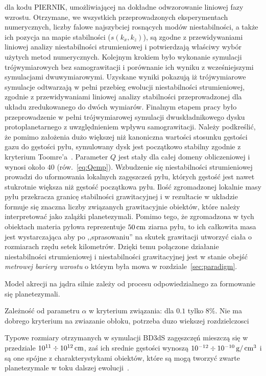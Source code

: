 dla kodu \textsc{PIERNIK}, umożliwiającej na dokładne odwzorowanie liniowej fazy
wzrostu.  Otrzymane, we wszystkich przeprowadzonych eksperymentach numerycznych,
liczby falowe najszybciej rosnących modów niestabilności, a także ich pozycja na
mapie stabilności ($s(k_x, k_z)$), są zgodne z przewidywaniami liniowej analizy
niestabilności strumieniowej i potwierdzają właściwy wybór użytych metod
numerycznych. Kolejnym krokiem było wykonanie symulacji trójwymiarowych bez
samograwitacji i porównanie ich wyniku z wcześniejszymi symulacjami
dwuwymiarowymi. Uzyskane wyniki pokazują iż trójwymiarowe symulacje odtwarzają w
pełni przebieg ewolucji niestabilności strumieniowej, zgodnie z przewidywaniami
liniowej analizy stabilności przeprowadzonej dla układu zredukowanego do dwóch
wymiarów. Finalnym etapem pracy było przeprowadzenie w pełni trójwymiarowej
symulacji dwuskładnikowego dysku protoplanetarnego z uwzględnieniem wpływu
samograwitacji. Należy podkreślić, że pomimo założenia dużo większej niż
kanoniczna wartości stosunku gęstości gazu do gęstości pyłu, symulowany dysk
jest początkowo stabilny zgodnie z kryterium Toomre'a~.
Parameter $Q$ jest stały dla całej domeny obliczeniowej i wynosi około $40$
(rów.~\ref{eq:Qemp}). Wzbudzenie się niestabilności strumieniowej prowadzi do
uformowania lokalnych zagęszczeń pyłu, których gęstość jest nawet stukrotnie
większa niż gęstość początkowa pyłu. Ilość zgromadzonej lokalnie masy pyłu
przekracza granicę stabilności grawitacyjnej i w rezultacie w układzie formuje
się znaczna liczby związanych grawitacyjnie obiektów, które należy interpretować
jako zalążki planetezymali. Pomimo tego, że zgromadzona w tych obiektach materia
pyłowa reprezentuje $50\hbox{$\thinspace\textrm{cm}$}$ ziarna pyłu, to ich całkowita masa jest
wystarczająca aby po ,,sprasowaniu'' na skutek grawitacji utworzyć ciała o
rozmiarach rzędu setek kilometrów. Dzięki temu połączone działanie
niestabilności strumieniowej i niestabilności grawitacyjnej jest w stanie obejść
\emph{metrowej bariery wzrostu} o którym była mowa w
rozdziale~\ref{sec:paradigm}.
%
\par Model akrecji na jądra silnie zależy od procesu odpowiedzialnego za formowanie
się planetezymali.

Zależność od parametru $\alpha$ w kryterium związania: dla $0.1$ tylko $8\%$.
Nie ma dobrego kryterium na zwiazanie obłoku, potrzeba duzo wiekszej rozdzielczosci

\par Typowe rozmiary otrzymanych w symulacji BD3dS zagęszczęń mieszczą się w
przedziale $10^{11} \div 10^{12}\hbox{$\thinspace\textrm{cm}$}$, zaś ich srednie gęstości wynoszą $10^{-12}
\div 10^{-10}\hbox{$\thinspace\textrm{g}$}/\hbox{$\thinspace\textrm{cm}$}^3$ i są one spójne z charakterystykami obiektów, które są
mogą tworzyć zwarte planetezymale w toku dalszej ewolucji~\cite{HS08}.

